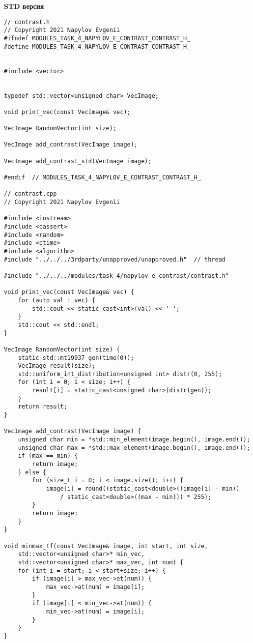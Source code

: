 \documentclass{report}
\begin{document}
    \textbf{STD версия}
    \begin{lstlisting}
// contrast.h
// Copyright 2021 Napylov Evgenii
#ifndef MODULES_TASK_4_NAPYLOV_E_CONTRAST_CONTRAST_H_
#define MODULES_TASK_4_NAPYLOV_E_CONTRAST_CONTRAST_H_


#include <vector>


typedef std::vector<unsigned char> VecImage;

void print_vec(const VecImage& vec);

VecImage RandomVector(int size);

VecImage add_contrast(VecImage image);

VecImage add_contrast_std(VecImage image);

#endif  // MODULES_TASK_4_NAPYLOV_E_CONTRAST_CONTRAST_H_

// contrast.cpp
// Copyright 2021 Napylov Evgenii

#include <iostream>
#include <cassert>
#include <random>
#include <ctime>
#include <algorithm>
#include "../../../3rdparty/unapproved/unapproved.h"  // thread

#include "../../../modules/task_4/napylov_e_contrast/contrast.h"

void print_vec(const VecImage& vec) {
    for (auto val : vec) {
        std::cout << static_cast<int>(val) << ' ';
    }
    std::cout << std::endl;
}

VecImage RandomVector(int size) {
    static std::mt19937 gen(time(0));
    VecImage result(size);
    std::uniform_int_distribution<unsigned int> distr(0, 255);
    for (int i = 0; i < size; i++) {
        result[i] = static_cast<unsigned char>(distr(gen));
    }
    return result;
}

VecImage add_contrast(VecImage image) {
    unsigned char min = *std::min_element(image.begin(), image.end());
    unsigned char max = *std::max_element(image.begin(), image.end());
    if (max == min) {
        return image;
    } else {
        for (size_t i = 0; i < image.size(); i++) {
            image[i] = round((static_cast<double>((image[i] - min))
                / static_cast<double>((max - min))) * 255);
        }
        return image;
    }
}

void minmax_tf(const VecImage& image, int start, int size,
    std::vector<unsigned char>* min_vec,
    std::vector<unsigned char>* max_vec, int num) {
    for (int i = start; i < start+size; i++) {
        if (image[i] > max_vec->at(num)) {
            max_vec->at(num) = image[i];
        }
        if (image[i] < min_vec->at(num)) {
            min_vec->at(num) = image[i];
        }
    }
}


\end{lstlisting}
\end{document}
